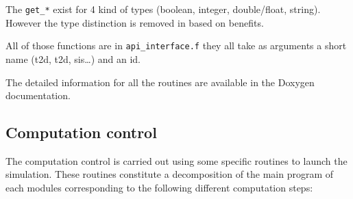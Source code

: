The \verb!get_*! exist for 4 kind of types (boolean, integer, double/float,
string). However the type distinction is removed in \TelApy{} based on
\python{} benefits.

All of those functions are in \verb!api_interface.f! they all take as arguments
a short name (t2d, t2d, sis\ldots) and an id.

The detailed information for all the routines are available in the Doxygen
documentation.

\subsection{Computation control}\label{subsec:exec}

The computation control is carried out using some specific routines to launch
the simulation. These routines constitute a decomposition of the main program
of each \telemacsystem{} modules corresponding to the following different
computation steps:

